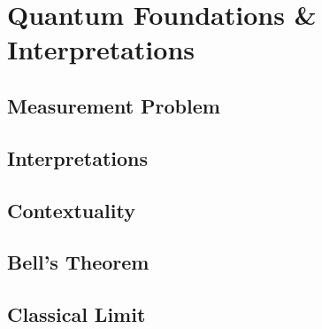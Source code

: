 \chapter{Quantum Foundations \& Interpretations}

\section{Measurement Problem}

\section{Interpretations}

\section{Contextuality}

\section{Bell's Theorem}

\section{Classical Limit}





